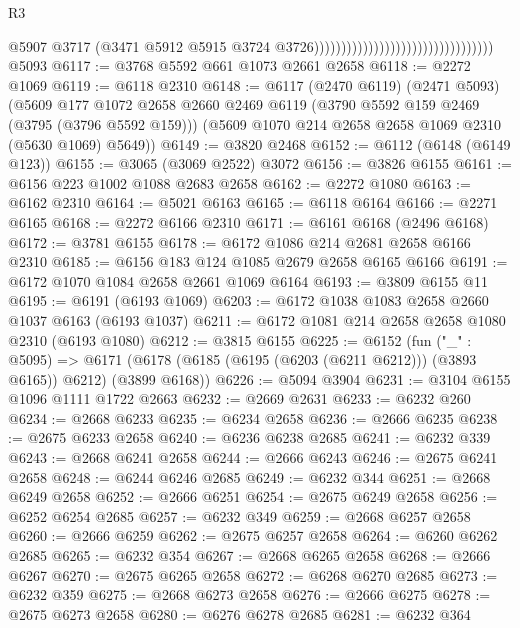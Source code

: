 \begin{lexlean}{R3}
\begin{coremodule}
                                                                    @5907
                                                                    @3717
                                                                    (@3471
                                                                      @5912
                                                                      @5915
                                                                      @3724
                                                                      @3726)))))))))))))))))))))))))))))))))
    @5093
@6117 := @3768 @5592 @661 @1073 @2661 @2658
@6118 := @2272 @1069
@6119 := @6118 @2310
@6148 := @6117
    (@2470 @6119)
    (@2471 @5093)
    (@5609
      @177
      @1072
      @2658
      @2660
      @2469
      @6119
      (@3790 @5592 @159 @2469 (@3795 (@3796 @5592 @159)))
      (@5609 @1070 @214 @2658 @2658 @1069 @2310 (@5630 @1069) @5649))
@6149 := @3820 @2468
@6152 := @6112 (@6148 (@6149 @123))
@6155 := @3065 (@3069 @2522) @3072
@6156 := @3826 @6155
@6161 := @6156 @223 @1002 @1088 @2683 @2658
@6162 := @2272 @1080
@6163 := @6162 @2310
@6164 := @5021 @6163
@6165 := @6118 @6164
@6166 := @2271 @6165
@6168 := @2272 @6166 @2310
@6171 := @6161 @6168 (@2496 @6168)
@6172 := @3781 @6155
@6178 := @6172 @1086 @214 @2681 @2658 @6166 @2310
@6185 := @6156 @183 @124 @1085 @2679 @2658 @6165 @6166
@6191 := @6172 @1070 @1084 @2658 @2661 @1069 @6164
@6193 := @3809 @6155 @11
@6195 := @6191 (@6193 @1069)
@6203 := @6172 @1038 @1083 @2658 @2660 @1037 @6163 (@6193 @1037)
@6211 := @6172 @1081 @214 @2658 @2658 @1080 @2310 (@6193 @1080)
@6212 := @3815 @6155
@6225 := @6152
    (fun ("_" : @5095) =>
    @6171 (@6178 (@6185 (@6195 (@6203 (@6211 @6212))) (@3893 @6165)) @6212) (@3899 @6168))
@6226 := @5094 @3904
@6231 := @3104 @6155 @1096 @1111 @1722 @2663
@6232 := @2669 @2631
@6233 := @6232 @260
@6234 := @2668 @6233
@6235 := @6234 @2658
@6236 := @2666 @6235
@6238 := @2675 @6233 @2658
@6240 := @6236 @6238 @2685
@6241 := @6232 @339
@6243 := @2668 @6241 @2658
@6244 := @2666 @6243
@6246 := @2675 @6241 @2658
@6248 := @6244 @6246 @2685
@6249 := @6232 @344
@6251 := @2668 @6249 @2658
@6252 := @2666 @6251
@6254 := @2675 @6249 @2658
@6256 := @6252 @6254 @2685
@6257 := @6232 @349
@6259 := @2668 @6257 @2658
@6260 := @2666 @6259
@6262 := @2675 @6257 @2658
@6264 := @6260 @6262 @2685
@6265 := @6232 @354
@6267 := @2668 @6265 @2658
@6268 := @2666 @6267
@6270 := @2675 @6265 @2658
@6272 := @6268 @6270 @2685
@6273 := @6232 @359
@6275 := @2668 @6273 @2658
@6276 := @2666 @6275
@6278 := @2675 @6273 @2658
@6280 := @6276 @6278 @2685
@6281 := @6232 @364

\end{coremodule}
\end{lexlean}
